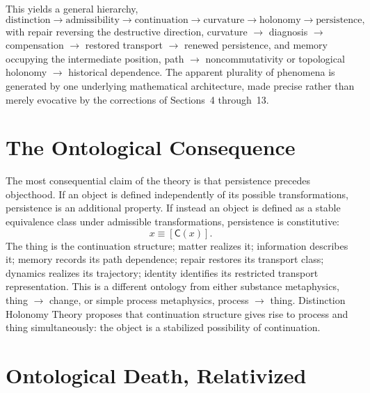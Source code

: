 \documentclass[11pt]{article}
\newcommand{\C}{\mathsf{C}}
\begin{document}
This yields a general hierarchy,
\[
\text{distinction} \rightarrow \text{admissibility} \rightarrow \text{continuation} \rightarrow \text{curvature} \rightarrow \text{holonomy} \rightarrow \text{persistence},
\]
with repair reversing the destructive direction, curvature $\rightarrow$ diagnosis $\rightarrow$ compensation $\rightarrow$ restored transport $\rightarrow$ renewed persistence, and memory occupying the intermediate position, path $\rightarrow$ noncommutativity or topological holonomy $\rightarrow$ historical dependence. The apparent plurality of phenomena is generated by one underlying mathematical architecture, made precise rather than merely evocative by the corrections of Sections~4 through~13.

\section{The Ontological Consequence}

The most consequential claim of the theory is that persistence precedes objecthood. If an object is defined independently of its possible transformations, persistence is an additional property. If instead an object is defined as a stable equivalence class under admissible transformations, persistence is constitutive:
\[
x \equiv [\C(x)].
\]
The thing is the continuation structure; matter realizes it; information describes it; memory records its path dependence; repair restores its transport class; dynamics realizes its trajectory; identity identifies its restricted transport representation. This is a different ontology from either substance metaphysics, thing $\rightarrow$ change, or simple process metaphysics, process $\rightarrow$ thing. Distinction Holonomy Theory proposes that continuation structure gives rise to process and thing simultaneously: the object is a stabilized possibility of continuation.

\section{Ontological Death, Relativized}
\end{document}
